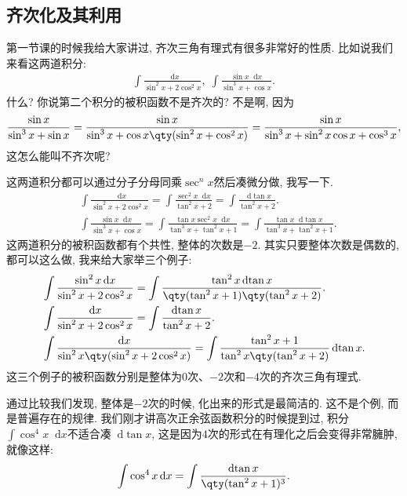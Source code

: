 \documentclass{ctexbook}
\newcommand*{\dif}{\mathop{}\!\mathrm{d}}
\begin{document}
{\subsection{齐次化及其利用}
第一节课的时候我给大家讲过, 齐次三角有理式有很多非常好的性质. 比如说我们来看这两道积分: 
\begin{align*}
\int\frac{\dif{x}}{\sin^{2}{x}+2\cos^{2}{x}},\;\int\frac{\sin{x}\dif{x}}{\sin^{3}{x}+\cos{x}}
.\end{align*}
什么? 你说第二个积分的被积函数不是齐次的? 不是啊, 因为
\begin{align*}
\frac{\sin{x}}{\sin^{3}{x}+\sin{x}}=\frac{\sin{x}}{\sin^{3}{x}+\cos{x}\qty(\sin^{2}{x}+\cos^{2}{x})}=\frac{\sin{x}}{\sin^{3}{x}+\sin^{2}{x}\cos{x}+\cos^{3}{x}}
,\end{align*}
这怎么能叫不齐次呢? \par
这两道积分都可以通过分子分母同乘$\sec^{n}{x}$然后凑微分做, 我写一下. 
\begin{align*}
{}&\int\frac{\dif{x}}{\sin^{2}{x}+2\cos^{2}{x}}=\int\frac{\sec^{2}{x}\dif{x}}{\tan^{2}{x}+2}=\int\frac{\dif{\tan{x}}}{\tan^{2}{x}+2}.\\
{}&\int\frac{\sin{x}\dif{x}}{\sin^{3}{x}+\cos{x}}=\int\frac{\tan{x}\sec^{2}{x}\dif{x}}{\tan^{3}{x}+\tan^{2}{x}+1}=\int\frac{\tan{x}\dif{\tan{x}}}{\tan^{3}{x}+\tan^{2}{x}+1}
.\end{align*}
这两道积分的被积函数都有个共性, 整体的次数是$-2$. 其实只要整体次数是偶数的, 都可以这么做, 我来给大家举三个例子: 
\begin{align*}
{}&\int\frac{\sin^{2}{x}\dif{x}}{\sin^{2}{x}+2\cos^{2}{x}}=\int\frac{\tan^{2}{x}\dif{\tan{x}}}{\qty(\tan^{2}{x}+1)\qty(\tan^{2}{x}+2)}.\\
{}&\int\frac{\dif{x}}{\sin^{2}{x}+2\cos^{2}{x}}=\int\frac{\dif{\tan{x}}}{\tan^{2}{x}+2}.\\
{}&\int\frac{\dif{x}}{\sin^{2}{x}\qty(\sin^{2}{x}+2\cos^{2}{x})}=\int\frac{\tan^{2}{x}+1}{\tan^{2}{x}\qty(\tan^{2}{x}+2)}\dif{\tan{x}}
.\end{align*}
这三个例子的被积函数分别是整体为$0$次、$-2$次和$-4$次的齐次三角有理式. \par
通过比较我们发现, 整体是$-2$次的时候, 化出来的形式是最简洁的. 这不是个例, 而是普遍存在的规律. 我们刚才讲高次正余弦函数积分的时候提到过, 积分$\int\cos^{4}{x}\dif{x}$不适合凑$\dif{\tan{x}}$, 这是因为$4$次的形式在有理化之后会变得非常臃肿, 就像这样: 
\begin{align*}
\int\cos^{4}{x}\dif{x}=\int\frac{\dif{\tan{x}}}{\qty(\tan^{2}{x}+1)^{3}}
.\end{align*}\par
}
\end{document}

